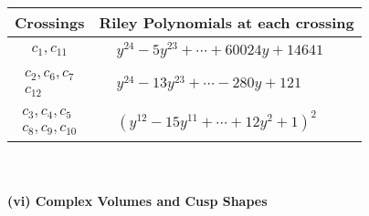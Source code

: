 \documentclass[1p]{elsarticle_modified}
\theoremstyle{definition}
\begin{document}
\begin{tabular}{m{50pt}|m{274pt}}
Crossings & \hspace{64pt}Riley Polynomials at each crossing \\
\hline $$\begin{aligned}c_{1},c_{11}\end{aligned}$$&$\begin{aligned}
&y^{24}-5 y^{23}+\cdots+60024 y+14641
\end{aligned}$\\
\hline $$\begin{aligned}c_{2},c_{6},c_{7}\\c_{12}\end{aligned}$$&$\begin{aligned}
&y^{24}-13 y^{23}+\cdots-280 y+121
\end{aligned}$\\
\hline $$\begin{aligned}c_{3},c_{4},c_{5}\\c_{8},c_{9},c_{10}\end{aligned}$$&$\begin{aligned}
&(y^{12}-15 y^{11}+\cdots+12 y^2+1)^{2}
\end{aligned}$\\
\hline
\end{tabular}\\~\\
\newpage\flushleft \textbf{(vi) Complex Volumes and Cusp Shapes}
\end{document}
